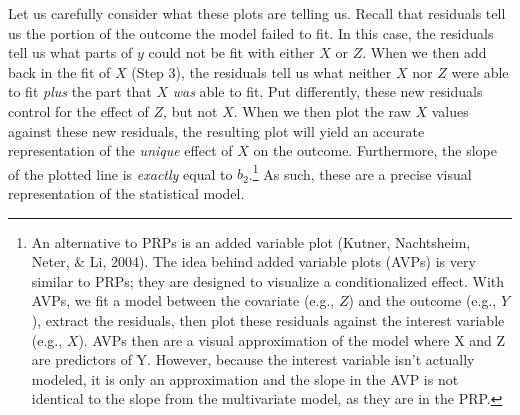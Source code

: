 \documentclass[
  man,floatsintext]{apa6}
\begin{document}
Let us carefully consider what these plots are telling us. Recall that residuals tell us the portion of the outcome the model failed to fit. In this case, the residuals tell us what parts of \(y\) could not be fit with either \(X\) or \(Z\). When we then add back in the fit of \(X\) (Step 3), the residuals tell us what neither \(X\) nor \(Z\) were able to fit \emph{plus} the part that \(X\) \emph{was} able to fit. Put differently, these new residuals control for the effect of \(Z\), but not \(X\). When we then plot the raw \(X\) values against these new residuals, the resulting plot will yield an accurate representation of the \emph{unique} effect of \(X\) on the outcome. Furthermore, the slope of the plotted line is \emph{exactly} equal to \(b_2\).\footnote{An alternative to PRPs is an added variable plot (Kutner, Nachtsheim, Neter, \& Li, 2004). The idea behind added variable plots (AVPs) is very similar to PRPs; they are designed to visualize a conditionalized effect. With AVPs, we fit a model between the covariate (e.g., \(Z\)) and the outcome (e.g., \(Y\)), extract the residuals, then plot these residuals against the interest variable (e.g., \(X\)). AVPs then are a visual approximation of the model where X and Z are predictors of Y. However, because the interest variable isn't actually modeled, it is only an approximation and the slope in the AVP is not identical to the slope from the multivariate model, as they are in the PRP.} As such, these are a precise visual representation of the statistical model.
\end{document}

